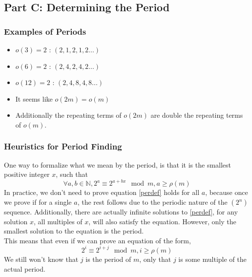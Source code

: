 \documentclass{article}
\begin{document}
  \subsection{Part C: Determining the Period}
  \subsubsection{Examples of Periods}
  \begin{itemize}
  \item $o(3) = 2$ : $(2, 1, 2, 1, 2 ...)$
  \item $o(6) = 2$ : $(2, 4, 2, 4, 2 ...)$
  \item $o(12)= 2$ : $(2, 4, 8, 4, 8 ...)$
  \item It seems like $o(2m) = o(m)$
  \item Additionally the repeating terms of $o(2m)$ are double the repeating terms of $o(m)$.
  \end{itemize}
  \subsubsection{Heuristics for Period Finding}
  One way to formalize what we mean by the period, is that it is the smallest positive integer $x$, such that
  \begin{equation}\label{perdef}
    \forall a, b \in \mathbb{N}, 2^a \equiv 2^{a+bx} \mod m, a \geq \rho(m)
  \end{equation}
  In practice, we don't need to prove equation \eqref{perdef} holds for all $a$, because once we prove if for a single $a$, the rest follows due to the periodic nature of the $(2^n)$ sequence. Additionally, there are actually infinite solutions to \eqref{perdef}, for any solution $x$, all multiples of $x$, will also satisfy the equation. However, only the smallest solution to the equation is the period.\\
  
  This means that even if we can prove an equation of the form,
  \begin{equation}\label{a}
    2^i \equiv 2^{i+j} \mod m, i \geq \rho(m)
  \end{equation}
  We still won't know that $j$ is the period of $m$, only that $j$ is some multiple of the actual period.\\
  
\end{document}
